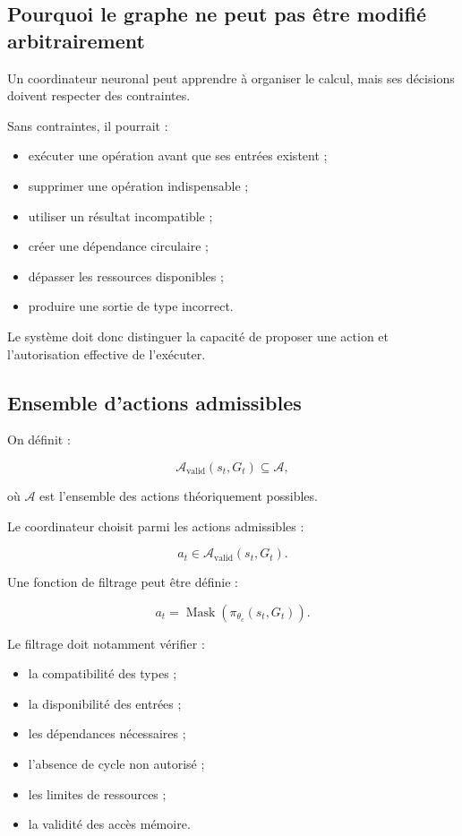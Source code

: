 \documentclass[11pt,a4paper]{article}
\begin{document}
\subsection{Pourquoi le graphe ne peut pas être modifié arbitrairement}

Un coordinateur neuronal peut apprendre à organiser le calcul,
mais ses décisions doivent respecter des contraintes.

Sans contraintes, il pourrait :
\begin{itemize}
  \item exécuter une opération avant que ses entrées existent ;
  \item supprimer une opération indispensable ;
  \item utiliser un résultat incompatible ;
  \item créer une dépendance circulaire ;
  \item dépasser les ressources disponibles ;
  \item produire une sortie de type incorrect.
\end{itemize}

Le système doit donc distinguer la capacité de proposer une action
et l'autorisation effective de l'exécuter.

\subsection{Ensemble d'actions admissibles}

On définit :

\[
\mathcal{A}_{\mathrm{valid}}(s_t,G_t)
\subseteq
\mathcal{A},
\]

où $\mathcal{A}$ est l'ensemble des actions théoriquement possibles.

Le coordinateur choisit parmi les actions admissibles :

\[
a_t
\in
\mathcal{A}_{\mathrm{valid}}(s_t,G_t).
\]

Une fonction de filtrage peut être définie :

\[
a_t
=
\operatorname{Mask}
\left(
\pi_{\theta_c}(s_t,G_t)
\right).
\]

Le filtrage doit notamment vérifier :
\begin{itemize}
  \item la compatibilité des types ;
  \item la disponibilité des entrées ;
  \item les dépendances nécessaires ;
  \item l'absence de cycle non autorisé ;
  \item les limites de ressources ;
  \item la validité des accès mémoire.
\end{itemize}
\end{document}
